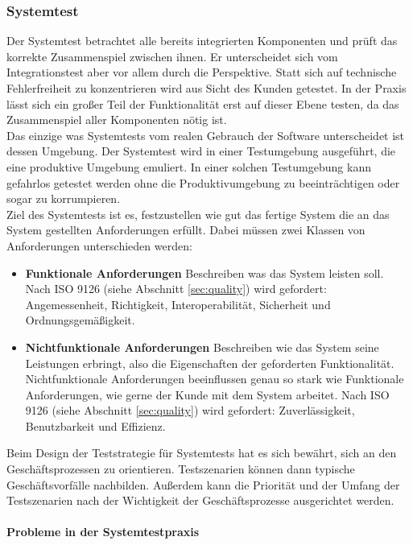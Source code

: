 \subsubsection{Systemtest}
Der Systemtest betrachtet alle bereits integrierten Komponenten und prüft das korrekte Zusammenspiel zwischen ihnen. Er unterscheidet sich vom Integrationstest aber vor allem durch die Perspektive. Statt sich auf technische Fehlerfreiheit zu konzentrieren wird aus Sicht des Kunden getestet. In der Praxis lässt sich ein großer Teil der Funktionalität erst auf dieser Ebene testen, da das Zusammenspiel aller Komponenten nötig ist.\\
Das einzige was Systemtests vom realen Gebrauch der Software unterscheidet ist dessen Umgebung. Der Systemtest wird in einer Testumgebung ausgeführt, die eine produktive Umgebung emuliert. In einer solchen Testumgebung kann gefahrlos getestet werden ohne die Produktivumgebung zu beeinträchtigen oder sogar zu korrumpieren.\\
Ziel des Systemtests ist es, festzustellen wie gut das fertige System die an das System gestellten Anforderungen erfüllt. Dabei müssen zwei Klassen von Anforderungen unterschieden werden\cite{spillner_basiswissen_2012}:

\begin{itemize}
\item \textbf{Funktionale Anforderungen} Beschreiben was das System leisten soll. Nach ISO 9126 (siehe Abschnitt \ref{sec:quality}) wird gefordert: Angemessenheit, Richtigkeit, Interoperabilität, Sicherheit und Ordnungsgemäßigkeit.
\item \textbf{Nichtfunktionale Anforderungen} Beschreiben wie das System seine Leistungen erbringt, also die Eigenschaften der geforderten Funktionalität. Nichtfunktionale Anforderungen beeinflussen genau so stark wie Funktionale Anforderungen, wie gerne der Kunde mit dem System arbeitet. Nach ISO 9126 (siehe Abschnitt \ref{sec:quality}) wird gefordert: Zuverlässigkeit, Benutzbarkeit und Effizienz.
\end{itemize}

Beim Design der Teststrategie für Systemtests hat es sich bewährt, sich an den Geschäftsprozessen zu orientieren. Testszenarien können dann typische Geschäftsvorfälle nachbilden. Außerdem kann die Priorität und  der Umfang der Testszenarien nach der Wichtigkeit der Geschäftsprozesse ausgerichtet werden.

\paragraph{Probleme in der Systemtestpraxis}

